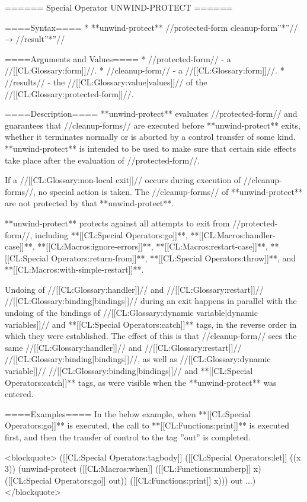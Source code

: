 ====== Special Operator UNWIND-PROTECT ======

====Syntax====
  * **unwind-protect** //protected-form cleanup-form''*''// → //result''*''//

====Arguments and Values====
  * //protected-form// - a //[[CL:Glossary:form]]//.
  * //cleanup-form// - a //[[CL:Glossary:form]]//.
  * //results// - the //[[CL:Glossary:value|values]]// of the //[[CL:Glossary:protected-form]]//.

====Description====
**unwind-protect** evaluates //protected-form// and guarantees that //cleanup-forms// are executed before **unwind-protect** exits, whether it terminates normally or is aborted by a control transfer of some kind. **unwind-protect** is intended to be used to make sure that certain side effects take place after the evaluation of //protected-form//.

If a //[[CL:Glossary:non-local exit]]// occurs during execution of //cleanup-forms//, no special action is taken. The //cleanup-forms// of **unwind-protect** are not protected by that **unwind-protect**.

**unwind-protect** protects against all attempts to exit from //protected-form//, including **[[CL:Special Operators:go]]**, **[[CL:Macros:handler-case]]**, **[[CL:Macros:ignore-errors]]**, **[[CL:Macros:restart-case]]**, **[[CL:Special Operators:return-from]]**, **[[CL:Special Operators:throw]]**, and **[[CL:Macros:with-simple-restart]]**.

Undoing of //[[CL:Glossary:handler]]// and //[[CL:Glossary:restart]]// //[[CL:Glossary:binding|bindings]]// during an exit happens in parallel with the undoing of the bindings of //[[CL:Glossary:dynamic variable|dynamic variables]]// and **[[CL:Special Operators:catch]]** tags, in the reverse order in which they were established. The effect of this is that //cleanup-form// sees the same //[[CL:Glossary:handler]]// and //[[CL:Glossary:restart]]// //[[CL:Glossary:binding|bindings]]//, as well as //[[CL:Glossary:dynamic variable]]// //[[CL:Glossary:binding|bindings]]// and **[[CL:Special Operators:catch]]** tags, as were visible when the **unwind-protect** was entered.

====Examples==== 
In the below example, when **[[CL:Special Operators:go]]** is executed, the call to **[[CL:Functions:print]]** is executed first, and then the transfer of control to the tag ''out'' is completed.

<blockquote>
([[CL:Special Operators:tagbody]] 
   ([[CL:Special Operators:let]] ((x 3)) 
     (unwind-protect 
         ([[CL:Macros:when]] ([[CL:Functions:numberp]] x) ([[CL:Special Operators:go]] out)) 
       ([[CL:Functions:print]] x))) 
 out 
   ...)
</blockquote>

